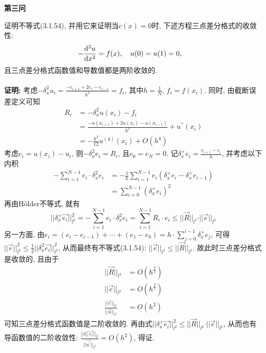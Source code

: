 \documentclass[12pt]{article}
\begin{document}
\begin{center}
	\textbf{第三问}
\end{center}
\noindent 证明不等式(3.1.54), 并用它来证明当$c(x)=0$时, 下述方程三点差分格式的收敛性:
\begin{align*}
	-\frac{{\rm d}^2u}{{\rm d}x^2}&=f(x),\quad u(0)=u(1)=0,
\end{align*}
\noindent 且三点差分格式函数值和导数值都是两阶收敛的.\\
\quad \\
\textbf{证明:} 考虑$-\delta_x^2u_i=\frac{-e_{i+1}+2e_i-e_{i-1}}{h^2}=f_i$, 其中$h=\frac{1}{N}$, $f_i=f(x_i)$. 同时, 由截断误差定义可知
\begin{align*}
	R_i&=-\delta_x^2u(x_i)-f_i\\
	&=\frac{-u(x_{i+1})+2u(x_i)-u(x_{i-1})}{h^2}+u^{''}(x_i)\\
	&=-\frac{h^2}{12}u^{(4)}(x_i)+O(h^4)
\end{align*}
\noindent 考虑$e_i=u(x_i)-u_i$, 则$-\delta_x^2e_i=R_i$, 且$e_0=e_N=0$. 记$\delta_x^+e_i=\frac{e_{i+1}-e_i}{h}$, 并考虑以下内积
\begin{align*}
	-\sum_{i=1}^{N-1}e_i\cdot\delta_x^2e_i&=-\frac{1}{h}\sum_{i=1}^{N-1}e_i(\delta_x^+e_i-\delta_x^+e_{i-1})\\
	&=\sum_{i=0}^{N-1}(\delta_x^+e_i)^2
\end{align*}
\noindent 再由Hölder不等式, 就有$$\vert \vert   \delta_x^+\overset{\rightarrow}{e_i } \vert  \vert^2_{l^2}=-\sum_{i=1}^{N-1}e_i\cdot\delta_x^2e_i=\sum_{i=1}^{N-1}R_i \cdot e_i\le \vert \vert \overset{\rightarrow}{R} \vert \vert_{l^2}\cdot \vert \vert   \overset{\rightarrow}{e}\vert \vert _{l^2}$$
\noindent 另一方面, 由$e_i=(e_i-e_{i-1})+\cdots+(e_1-e_0)=h\cdot\sum_{j=0}^{i-1}\delta_x^+e_j$, 可得$\vert \vert \overset{\rightarrow}{e}\vert \vert^2_{l^2}\le\frac{1}{2}\vert \vert \delta_x^2\overset{\rightarrow}{e_i } \vert  \vert^2_{l^2}$, 从而最终有不等式(3.1.54): $\vert \vert \overset{\rightarrow}{e}\vert \vert_{l^2}\le \vert \vert \overset{\rightarrow}{R} \vert \vert_{l^2}$. 故此时三点差分格式是收敛的, 且由于
\begin{align*}
	\vert \vert \overset{\rightarrow}{R} \vert \vert_{l^2}&=O(h^{\frac{3}{2}})\\
	\vert \vert \overset{\rightarrow}{e} \vert \vert_{l^2}&=O(h^{\frac{3}{2}})\\
	\frac{\vert \vert \overset{\rightarrow}{e}\vert \vert_{l^2}}{\vert \vert \overset{\rightarrow}{u} \vert \vert_{l^2}}&=O(h^2)
\end{align*}
\noindent 可知三点差分格式函数值是二阶收敛的. 再由式$\vert \vert   \delta_x^+\overset{\rightarrow}{e_i } \vert  \vert^2_{l^2}\le\vert \vert \overset{\rightarrow}{R} \vert \vert_{l^2}\cdot \vert \vert   \overset{\rightarrow}{e}\vert \vert _{l^2}$, 从而也有导函数值的二阶收敛性: $\frac{\vert \vert   \delta_x^+\overset{\rightarrow}{e_i } \vert  \vert_{l^2} }{\vert \vert \overset{\rightarrow}{u^{'}}\vert \vert_{l^2}}=O(h^2)$, 得证.\\
\end{document}
